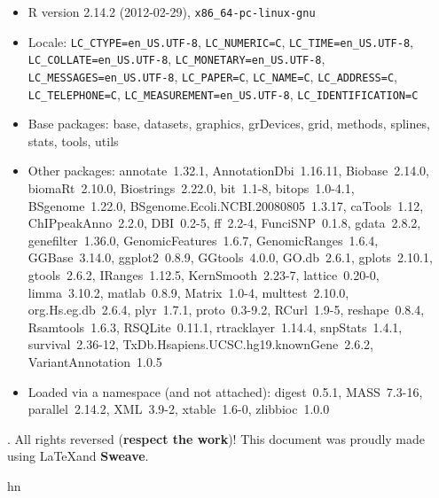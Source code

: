 \documentclass[12pt,fullpage]{article}
\begin{document}
\begin{itemize}\raggedright
  \item R version 2.14.2 (2012-02-29), \verb|x86_64-pc-linux-gnu|
  \item Locale: \verb|LC_CTYPE=en_US.UTF-8|, \verb|LC_NUMERIC=C|, \verb|LC_TIME=en_US.UTF-8|, \verb|LC_COLLATE=en_US.UTF-8|, \verb|LC_MONETARY=en_US.UTF-8|, \verb|LC_MESSAGES=en_US.UTF-8|, \verb|LC_PAPER=C|, \verb|LC_NAME=C|, \verb|LC_ADDRESS=C|, \verb|LC_TELEPHONE=C|, \verb|LC_MEASUREMENT=en_US.UTF-8|, \verb|LC_IDENTIFICATION=C|
  \item Base packages: base, datasets, graphics, grDevices, grid,
    methods, splines, stats, tools, utils
  \item Other packages: annotate~1.32.1, AnnotationDbi~1.16.11,
    Biobase~2.14.0, biomaRt~2.10.0, Biostrings~2.22.0, bit~1.1-8,
    bitops~1.0-4.1, BSgenome~1.22.0,
    BSgenome.Ecoli.NCBI.20080805~1.3.17, caTools~1.12,
    ChIPpeakAnno~2.2.0, DBI~0.2-5, ff~2.2-4, FunciSNP~0.1.8,
    gdata~2.8.2, genefilter~1.36.0, GenomicFeatures~1.6.7,
    GenomicRanges~1.6.4, GGBase~3.14.0, ggplot2~0.8.9, GGtools~4.0.0,
    GO.db~2.6.1, gplots~2.10.1, gtools~2.6.2, IRanges~1.12.5,
    KernSmooth~2.23-7, lattice~0.20-0, limma~3.10.2, matlab~0.8.9,
    Matrix~1.0-4, multtest~2.10.0, org.Hs.eg.db~2.6.4, plyr~1.7.1,
    proto~0.3-9.2, RCurl~1.9-5, reshape~0.8.4, Rsamtools~1.6.3,
    RSQLite~0.11.1, rtracklayer~1.14.4, snpStats~1.4.1,
    survival~2.36-12, TxDb.Hsapiens.UCSC.hg19.knownGene~2.6.2,
    VariantAnnotation~1.0.5
  \item Loaded via a namespace (and not attached): digest~0.5.1,
    MASS~7.3-16, parallel~2.14.2, XML~3.9-2, xtable~1.6-0,
    zlibbioc~1.0.0
\end{itemize}
. All rights reversed (\textbf{respect the work})! This
document was proudly made using \LaTeX and \textbf{Sweave}.

hn
\end{document}
